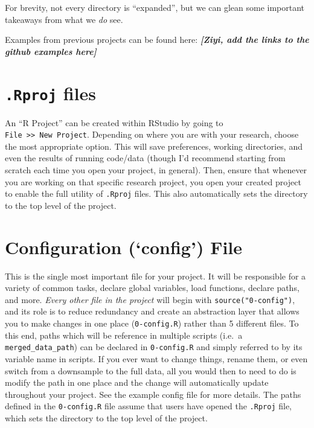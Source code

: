 \documentclass[
]{book}
\begin{document}
For brevity, not every directory is ``expanded'', but we can glean some important takeaways from what we \emph{do} see.

Examples from previous projects can be found here:
\textbf{\emph{{[}Ziyi, add the links to the github examples here{]}}}

\section{\texorpdfstring{\texttt{.Rproj} files}{.Rproj files}}\label{rproj-files}

An ``R Project'' can be created within RStudio by going to \texttt{File\ \textgreater{}\textgreater{}\ New\ Project}. Depending on where you are with your research, choose the most appropriate option. This will save preferences, working directories, and even the results of running code/data (though I'd recommend starting from scratch each time you open your project, in general). Then, ensure that whenever you are working on that specific research project, you open your created project to enable the full utility of \texttt{.Rproj} files. This also automatically sets the directory to the top level of the project.

\section{Configuration (`config') File}\label{configuration-config-file}

This is the single most important file for your project. It will be responsible for a variety of common tasks, declare global variables, load functions, declare paths, and more. \emph{Every other file in the project} will begin with \texttt{source("0-config")}, and its role is to reduce redundancy and create an abstraction layer that allows you to make changes in one place (\texttt{0-config.R}) rather than 5 different files. To this end, paths which will be reference in multiple scripts (i.e.~a \texttt{merged\_data\_path}) can be declared in \texttt{0-config.R} and simply referred to by its variable name in scripts. If you ever want to change things, rename them, or even switch from a downsample to the full data, all you would then to need to do is modify the path in one place and the change will automatically update throughout your project. See the example config file for more details. The paths defined in the \texttt{0-config.R} file assume that users have opened the \texttt{.Rproj} file, which sets the directory to the top level of the project.
\end{document}
